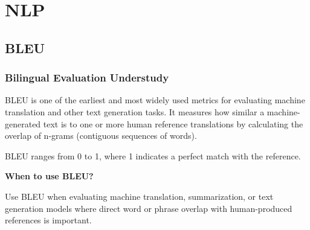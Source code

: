 \chapter{NLP}


\clearpage
\thispagestyle{nlpstyle}
\section{BLEU}
\subsection{Bilingual Evaluation Understudy}



BLEU is one of the earliest and most widely used metrics for evaluating machine translation and other
text generation tasks. It measures how similar a machine-generated text is to one or more human
reference translations by calculating the overlap of n-grams (contiguous sequences of words).

\begin{center}
\end{center}

BLEU ranges from 0 to 1, where 1 indicates a perfect match with the reference.

\textbf{When to use BLEU?}

Use BLEU when evaluating machine translation, summarization, or text generation models where direct
word or phrase overlap with human-produced references is important.

